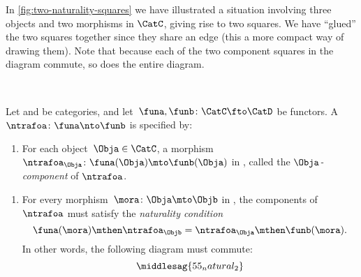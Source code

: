 In \cref{fig:two-naturality-squares} we have illustrated a situation involving three objects and two morphisms in $\CatC$, giving rise to two squares.
We have ``glued'' the two squares together since they share an edge (this a more compact way of drawing them).
Note that because each of the two component squares in the diagram commute, so does the entire diagram.

%
\begin{marginfigure}
    \centering
    \caption{}
    \label{fig:two-naturality-squares}
\end{marginfigure}
%

\


\begin{ctdefinition}
    \label{def:natural-transformation}
    Let \CatC and \CatD be categories, and let~$\funa,\funb\colon \CatC\fto \CatD$ be functors.
    A \emph{}~$\ntrafoa \colon \funa\nto \funb$ is specified by:

    \constit
    \begin{enumerate}
        \item For each object~$\Obja\in \CatC$, a morphism $\ntrafoa_\Obja \colon \funa(\Obja)\mto \funb(\Obja)$ in \CatD, called the $\Obja$\emph{-component} of $\ntrafoa$.
    \end{enumerate}
    \condit
    \begin{enumerate}
        \item For every morphism~$\mora\colon \Obja\mto \Objb$ in \CatC, the components of $\ntrafoa$ must satisfy the \emph{naturality condition}
              \begin{equation}
                  \funa(\mora)\mthen \ntrafoa_\Objb = \ntrafoa_\Obja\mthen \funb(\mora).
              \end{equation}
              In other words, the following diagram must commute:
              \begin{equation}
                  \label{fig:def-naturality-square}
                  \middlesag{55_natural_2}
              \end{equation}
    \end{enumerate}
\end{ctdefinition}

